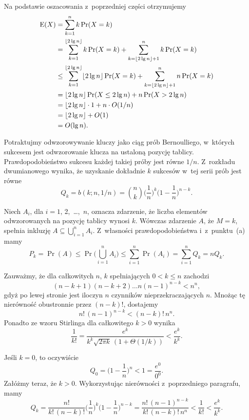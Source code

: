 \subproblem %
Na podstawie oszacowania z~poprzedniej części otrzymujemy
\begin{align*}
	\operatorname{E}(X) &= \sum_{k=1}^nk\Pr(X=k) \\
	&= \sum_{k=1}^{\lfloor2\lg n\rfloor}k\Pr(X=k)+\sum_{k=\lfloor2\lg n\rfloor+1}^nk\Pr(X=k) \\
	&\le \sum_{k=1}^{\lfloor2\lg n\rfloor}\lfloor2\lg n\rfloor\Pr(X=k)+\sum_{k=\lfloor2\lg n\rfloor+1}^nn\Pr(X=k) \\
	&= \lfloor2\lg n\rfloor\Pr(X\le2\lg n)+n\Pr(X>2\lg n) \\
	&= \lfloor2\lg n\rfloor\cdot1+n\cdot O(1/n) \\
	&= \lfloor2\lg n\rfloor+O(1) \\
	&= O(\lg n).
\end{align*}


\subproblem %
Potraktujmy odwzorowywanie kluczy jako ciąg prób Bernoulliego, w~których sukcesem jest odwzorowanie klucza na ustaloną pozycję tablicy. Prawdopodobieństwo sukcesu każdej takiej próby jest równe $1/n$. Z~rozkładu dwumianowego wynika, że uzyskanie dokładnie $k$ sukcesów w~tej serii prób jest równe
\[
	Q_k = b(k;n,1/n) = \binom{n}{k}\biggl(\frac{1}{n}\biggr)^k\biggl(1-\frac{1}{n}\biggr)^{n-k}.
\]

\subproblem %
Niech $A_i$, dla $i=1$, 2,~\dots,~$n$, oznacza zdarzenie, że liczba elementów odwzorowanych na  pozycję tablicy wynosi $k$. Wówczas zdarzenie $A$, że $M=k$, spełnia inkluzję $A\subseteq\bigcup_{i=1}^nA_i$. Z~własności prawdopodobieństwa i~z~punktu~(a) mamy
\[
	P_k = \Pr(A) \le \Pr\biggl(\bigcup_{i=1}^nA_i\biggr) \le \sum_{i=1}^n\Pr(A_i) = \sum_{i=1}^nQ_k = nQ_k.
\]

\subproblem %
Zauważmy, że dla całkowitych $n$, $k$ spełniających $0<k\le n$ zachodzi
\[
	(n-k+1)(n-k+2)\dots n(n-1)^{n-k} < n^n,
\]
gdyż po lewej stronie jest iloczyn $n$ czynników nieprzekraczających $n$. Mnożąc tę nierówność obustronnie przez $(n-k)!$, dostajemy
\[
	n!\,(n-1)^{n-k} < (n-k)!\,n^n.
\]
Ponadto ze wzoru Stirlinga dla całkowitego $k>0$ wynika
\[
	\frac{1}{k!} = \frac{e^k}{k^k\sqrt{2\pi k}\,(1+\Theta(1/k))} < \frac{e^k}{k^k}.
\]

Jeśli $k=0$, to oczywiście
\[
	Q_0 = \biggl(1-\frac{1}{n}\biggr)^n < 1 = \frac{e^0}{0^0}.
\]
Załóżmy teraz, że $k>0$. Wykorzystując nierówności z~poprzedniego paragrafu, mamy
\[
	Q_k = \frac{n!}{k!\,(n-k)!}\biggl(\frac{1}{n}\biggr)^k\biggl(1-\frac{1}{n}\biggr)^{n-k} = \frac{n!\,(n-1)^{n-k}}{k!\,(n-k)!\,n^n} < \frac{1}{k!} < \frac{e^k}{k^k}.
\]

